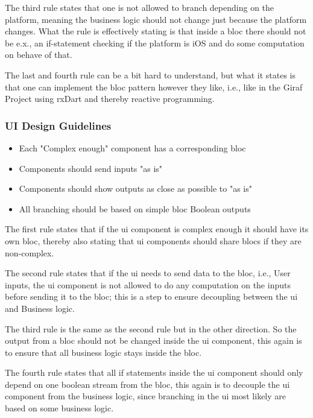 The third rule states that one is not allowed to branch depending on the platform, meaning the business logic should not change just because the platform changes. What the rule is effectively stating is that inside a \gls{bloc} there should not be e.x., an if-statement checking if the platform is iOS and do some computation on behave of that.

The last and fourth rule can be a bit hard to understand, but what it states is that one can implement the \gls{bloc} pattern however they like, i.e., like in the Giraf Project using rxDart and thereby reactive programming.

\subsubsection{UI Design Guidelines}
\begin{itemize}
  \item Each "Complex enough" component has a corresponding \gls{bloc}
  \item Components should send inputs "as is"
  \item Components should show outputs as close as possible to "as is"
  \item All branching should be based on simple \gls{bloc} Boolean outputs
\end{itemize}

The first rule states that if the \gls{ui} component is complex enough it should have its own \gls{bloc}, thereby also stating that \gls{ui} components should share \glspl{bloc} if they are non-complex.

The second rule states that if the \gls{ui} needs to send data to the \gls{bloc}, i.e., User inputs, the \gls{ui} component is not allowed to do any computation on the inputs before sending it to the \gls{bloc}; this is a step to ensure decoupling between the \gls{ui} and Business logic.

The third rule is the same as the second rule but in the other direction. So the output from a \gls{bloc} should not be changed inside the \gls{ui} component, this again is to ensure that all business logic stays inside the \gls{bloc}.

The fourth rule states that all if statements inside the \gls{ui} component should only depend on one boolean stream from the \gls{bloc}, this again is to decouple the \gls{ui} component from the business logic, since branching in the \gls{ui} most likely are based on some business logic.

